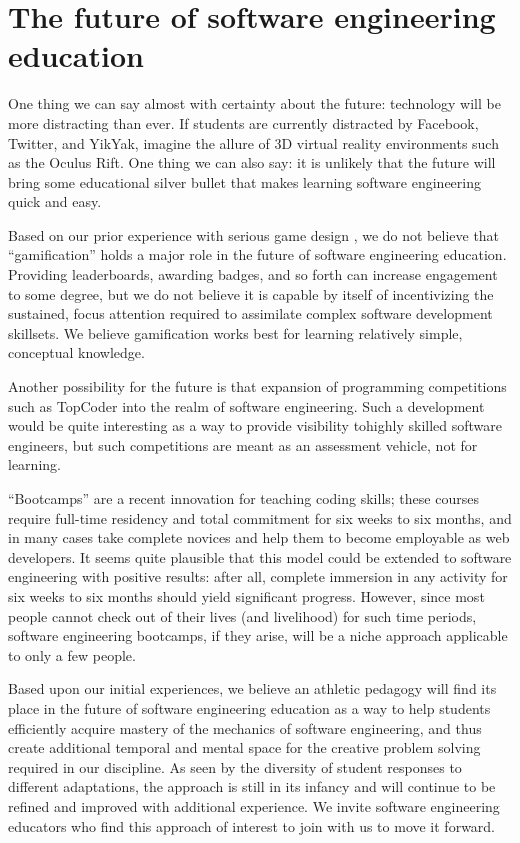 \section{The future of software engineering education}

One thing we can say almost with certainty about the future: technology will be more distracting than ever. If students are currently distracted by Facebook, Twitter, and YikYak, imagine the allure of 3D virtual reality environments such as the Oculus Rift.  One thing we can also say: it is unlikely that the future will bring some educational silver bullet that makes learning software engineering quick and easy. 

Based on our prior experience with serious game design \cite{csdl2-12-06}, we do not believe that ``gamification'' holds a major role in the future of software engineering education. Providing leaderboards, awarding badges, and so forth can increase engagement to some degree, but we do not believe it is capable by itself of incentivizing the sustained, focus attention required to assimilate complex software development skillsets. We believe gamification works best for learning relatively simple, conceptual knowledge.

Another possibility for the future is that expansion of programming competitions such as TopCoder into the realm of software engineering.  Such a development would be quite interesting as a way to provide visibility tohighly skilled software engineers, but such competitions are meant as an assessment vehicle, not for learning. 

``Bootcamps'' are a recent innovation for teaching coding skills; these courses require full-time residency and total commitment for six weeks to six months, and in many cases take complete novices and help them to become employable as web developers.   It seems quite plausible that this model could be extended to software engineering with positive results: after all, complete immersion in any activity for six weeks to six months should yield significant progress.  However, since most people cannot check out of their lives (and livelihood) for such time periods, software engineering bootcamps, if they arise, will be a niche approach applicable to only a few people.

Based upon our initial experiences, we believe an athletic pedagogy will find its place in the future of software engineering education as a way to help students efficiently acquire mastery of the mechanics of software engineering, and thus create additional temporal and mental space for the creative problem solving required in our discipline. As seen by the diversity of student responses to different adaptations, the approach is still in its infancy and will continue to be refined and improved with additional experience. We invite software engineering educators who find this approach of interest to join with us to move it forward. 

